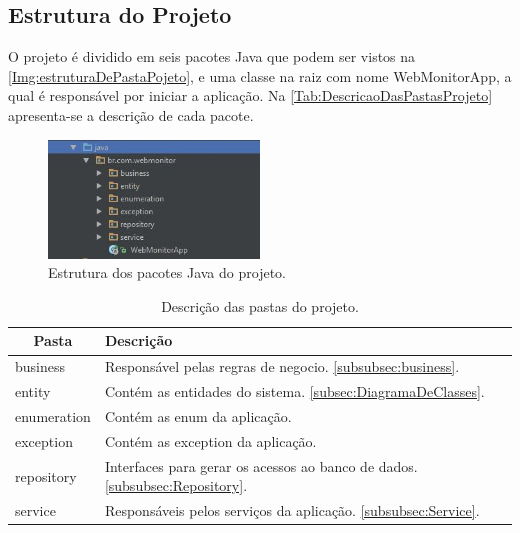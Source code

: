 \subsection{Estrutura do Projeto}\label{subsec:EstruturaDoProjeto}

O projeto é dividido em seis pacotes Java que podem ser vistos na \autoref{Img:estruturaDePastaPojeto}, e uma classe na raiz com nome WebMonitorApp, a qual é responsável por iniciar a aplicação. Na \autoref{Tab:DescricaoDasPastasProjeto} apresenta-se a descrição de cada pacote.

\begin{figure}[H]
	\centering
	\includegraphics[width=0.5\textwidth]{figuras/estruturaPojeto.JPG}
	\caption[Estrutura dos pacotes Java do projeto.]{Estrutura dos pacotes Java do projeto.}
	\label{Img:estruturaDePastaPojeto}
	
\end{figure}
	
\begin{table}[!ht]
\centering
\begin{tabular}{|l|l|}
\hline
\multicolumn{1}{|c|}{{\color[HTML]{000000} \textbf{Pasta}}} & {\color[HTML]{000000} \textbf{Descrição}} \\ \hline
business                                                    & \multicolumn{1}{p{10.00cm}|}{Responsável pelas regras de negocio. \autoref{subsubsec:business}. }\\ \hline
entity                                                      & \multicolumn{1}{p{10.00cm}|}{Contém as entidades do sistema. \autoref{subsec:DiagramaDeClasses}. }\\ \hline
enumeration                                                 & \multicolumn{1}{p{10.00cm}|}{Contém as enum da aplicação.}\\ \hline
exception                                                   & \multicolumn{1}{p{10.00cm}|}{Contém as exception da aplicação.}\\ \hline
repository                                                  & \multicolumn{1}{p{10.00cm}|}{Interfaces para gerar os acessos ao banco de dados. \autoref{subsubsec:Repository}.}\\ \hline
service                                                     & \multicolumn{1}{p{10.00cm}|}{Responsáveis pelos serviços da aplicação. \autoref{subsubsec:Service}.}\\ \hline
\end{tabular}
\caption{Descrição das pastas do projeto.}
\label{Tab:DescricaoDasPastasProjeto}
\end{table}



